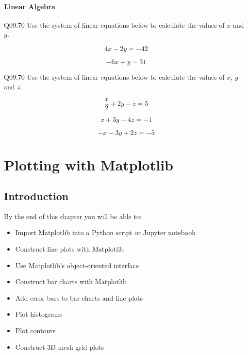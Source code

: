 \documentclass{book}
\begin{document}
    
        \hypertarget{linear-algebra}{%
\subsubsection{Linear Algebra}\label{linear-algebra}}
    




    
        Q09.70 Use the system of linear equations below to calculate the values
of \(x\) and \(y\).

\[ 4x - 2y = -42 \]

\[ -6x + y = 31 \]

Q09.70 Use the system of linear equations below to calculate the values
of \(x\), \(y\) and \(z\).

\[ \frac{x}{2} +2y - z = 5 \]

\[ x + 3y - 4z = -1 \]

\[ -x - 3y + 2z = -5 \]
    




    
        \hypertarget{plotting-with-matplotlib}{%
\chapter{Plotting with Matplotlib}\label{plotting-with-matplotlib}}
    




    
        \hypertarget{introduction}{%
\section{Introduction}\label{introduction}}
    




    
        By the end of this chapter you will be able to:

\begin{itemize}
\item
  Import Matplotlib into a Python script or Jupyter notebook
\item
  Construct line plots with Matplotlib
\item
  Use Matplotlib's object-oriented interface
\item
  Construct bar charts with Matplotlib
\item
  Add error bars to bar charts and line plots
\item
  Plot histograms
\item
  Plot contours
\item
  Construct 3D mesh grid plots
\end{itemize}
        \newpage
\end{document}
